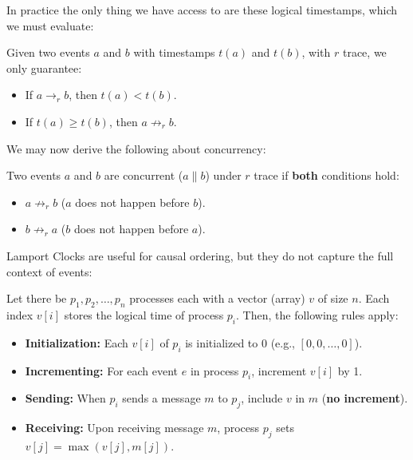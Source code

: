 \noindent
In practice the only thing we have access to are these logical timestamps, which we must evaluate:
\begin{theo}

    Given two events $a$ and $b$ with timestamps $t(a)$ and $t(b)$, with $r$ trace, we only guarantee:
    \begin{itemize}
        \item If $a \rightarrow_r b$, then $t(a) < t(b)$.
        \item If $t(a) \geq t(b)$, then $a \not\rightarrow_r b$.
    \end{itemize}
\end{theo}

\newpage 

\noindent
We may now derive the following about concurrency:
\begin{theo}

    Two events $a$ and $b$ are concurrent ($a \parallel b$) under $r$ trace if \textbf{both} conditions 
    hold:
    \begin{itemize}
        \item $a \not\rightarrow_r b$ ($a$ does not happen before $b$).
        \item $b \not\rightarrow_r a$ ($b$ does not happen before $a$).
    \end{itemize}
\end{theo}

\noindent
Lamport Clocks are useful for causal ordering, but they do not capture the full context of events:
\begin{Def}

   Let there be $p_1, p_2, \ldots, p_n$ processes each with a vector (array) $v$ of size $n$. Each index $v[i]$ stores the logical time of process $p_i$.
   Then, the following rules apply:
   \begin{itemize}
    \item \textbf{Initialization:} Each $v[i]$ of $p_i$ is initialized to 0 (e.g., $[0,0,\dots,0]$).
    \item \textbf{Incrementing:} For each event $e$ in process $p_i$, increment $v[i]$ by 1.
    \item \textbf{Sending:} When $p_i$ sends a message $m$ to $p_j$, include $v$ in $m$ (\textbf{no increment}).
    \item \textbf{Receiving:} Upon receiving message $m$, process $p_j$ sets $v[j] = \max(v[j], m[j])$.
   \end{itemize}
\end{Def}
